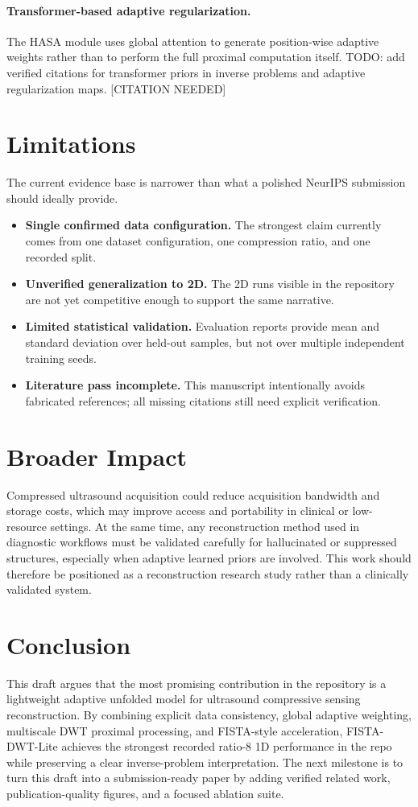 \documentclass{article}
\begin{document}
\paragraph{Transformer-based adaptive regularization.}
The HASA module uses global attention to generate position-wise adaptive weights rather than to perform the full proximal computation itself. TODO: add verified citations for transformer priors in inverse problems and adaptive regularization maps. [CITATION NEEDED]

\section{Limitations}
The current evidence base is narrower than what a polished NeurIPS submission should ideally provide.
\begin{itemize}[leftmargin=*, noitemsep]
  \item \textbf{Single confirmed data configuration.} The strongest claim currently comes from one dataset configuration, one compression ratio, and one recorded split.
  \item \textbf{Unverified generalization to 2D.} The 2D runs visible in the repository are not yet competitive enough to support the same narrative.
  \item \textbf{Limited statistical validation.} Evaluation reports provide mean and standard deviation over held-out samples, but not over multiple independent training seeds.
  \item \textbf{Literature pass incomplete.} This manuscript intentionally avoids fabricated references; all missing citations still need explicit verification.
\end{itemize}

\section{Broader Impact}
Compressed ultrasound acquisition could reduce acquisition bandwidth and storage costs, which may improve access and portability in clinical or low-resource settings. At the same time, any reconstruction method used in diagnostic workflows must be validated carefully for hallucinated or suppressed structures, especially when adaptive learned priors are involved. This work should therefore be positioned as a reconstruction research study rather than a clinically validated system.

\section{Conclusion}
This draft argues that the most promising contribution in the repository is a lightweight adaptive unfolded model for ultrasound compressive sensing reconstruction. By combining explicit data consistency, global adaptive weighting, multiscale DWT proximal processing, and FISTA-style acceleration, FISTA-DWT-Lite achieves the strongest recorded ratio-8 1D performance in the repo while preserving a clear inverse-problem interpretation. The next milestone is to turn this draft into a submission-ready paper by adding verified related work, publication-quality figures, and a focused ablation suite.

% 
% 
\end{document}
